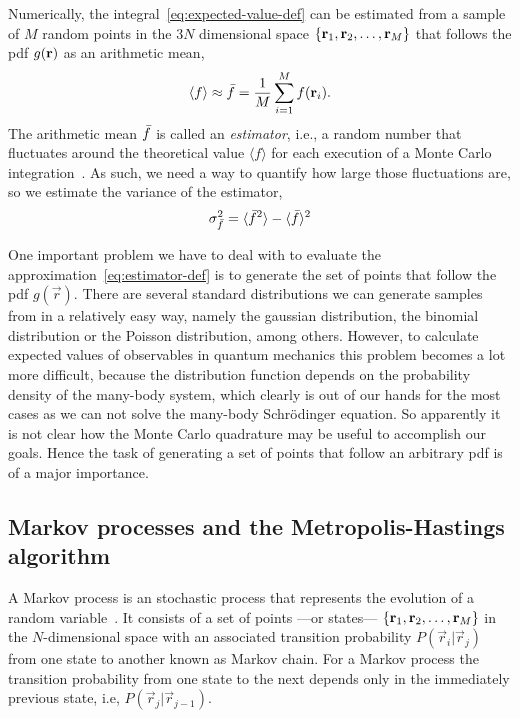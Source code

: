 Numerically, the integral~\eqref{eq:expected-value-def} can be estimated from a
sample of $M$ random points in the $3N$ dimensional space $\{\mathbf{r}_1, \mathbf{r}_2,
  \ldots, \mathbf{r}_M\}$ that follows the pdf $g(\mathbf{r})$ as an arithmetic mean,
%
\begin{equation}
  \label{eq:estimator-def}
  \langle f \rangle \approx \estimator{f} = \frac{1}{M} \sum_{i=1}^{M} f(\vecr_i).
\end{equation}
%
The arithmetic mean $\bar{f}$ is called an \textit{estimator}, i.e., a
random number that fluctuates around the theoretical value $\langle f \rangle$
for each execution of a Monte Carlo integration~\cite{bib:janke.2002}. As such,
we need a way to quantify how large those fluctuations are, so we estimate the
variance of the estimator,
%
\begin{equation}
  \label{eq:estimator-variance-def}
  \var[\estimator{f}] = \langle \estimator{f}^2 \rangle - \langle \estimator{f} \rangle^2
\end{equation}

One important problem we have to deal with to evaluate the
approximation~\eqref{eq:estimator-def} is to generate the set of points that
follow the pdf $g(\vec r)$. There are several standard distributions we can
generate samples from in a relatively easy way, namely the gaussian
distribution, the binomial distribution or the Poisson distribution, among
others. However, to calculate expected values of observables in quantum
mechanics this problem becomes a lot more difficult, because the distribution
function depends on the probability density of the many-body system, which
clearly is out of our hands for the most cases as we can not solve the many-body
Schrödinger equation. So apparently it is not clear how the Monte Carlo
quadrature may be useful to accomplish our goals. Hence the task of generating a
set of points that follow an arbitrary pdf is of a major importance.


\subsection{Markov processes and the Metropolis-Hastings algorithm}

A Markov process is an stochastic process that represents the evolution of a
random variable~\cite{bib:toulouse-adv-quant-chem.73.2016}. It consists of a set
of points ---or states--- $\{\mathbf{r}_1, \mathbf{r}_2, \ldots, \mathbf{r}_M\}$ in the
$N$-dimensional space with an associated transition probability $P(\vec r_i |
  \vec r_{j})$ from one state to another known as Markov chain. For a Markov
process the transition probability from one state to the next depends only in
the immediately previous state, i.e, $P(\vec r_j | \vec r_{j-1})$.

